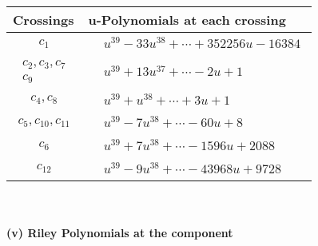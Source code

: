 \documentclass[1p]{elsarticle_modified}
\theoremstyle{definition}
\begin{document}
\begin{tabular}{m{50pt}|m{274pt}}
Crossings & \hspace{64pt}u-Polynomials at each crossing \\
\hline $$\begin{aligned}c_{1}\end{aligned}$$&$\begin{aligned}
&u^{39}-33 u^{38}+\cdots+352256 u-16384
\end{aligned}$\\
\hline $$\begin{aligned}c_{2},c_{3},c_{7}\\c_{9}\end{aligned}$$&$\begin{aligned}
&u^{39}+13 u^{37}+\cdots-2 u+1
\end{aligned}$\\
\hline $$\begin{aligned}c_{4},c_{8}\end{aligned}$$&$\begin{aligned}
&u^{39}+u^{38}+\cdots+3 u+1
\end{aligned}$\\
\hline $$\begin{aligned}c_{5},c_{10},c_{11}\end{aligned}$$&$\begin{aligned}
&u^{39}-7 u^{38}+\cdots-60 u+8
\end{aligned}$\\
\hline $$\begin{aligned}c_{6}\end{aligned}$$&$\begin{aligned}
&u^{39}+7 u^{38}+\cdots-1596 u+2088
\end{aligned}$\\
\hline $$\begin{aligned}c_{12}\end{aligned}$$&$\begin{aligned}
&u^{39}-9 u^{38}+\cdots-43968 u+9728
\end{aligned}$\\
\hline
\end{tabular}\\~\\
\newpage\renewcommand{\arraystretch}{1}
\flushleft \textbf{(v) Riley Polynomials at the component}\newline \\
\end{document}
